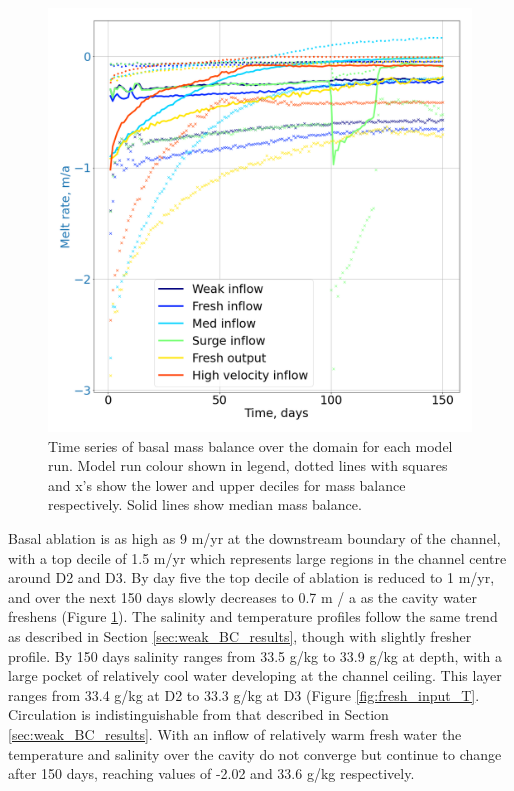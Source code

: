 \begin{figure}[!ht]
\centering
\includegraphics[width=1\textwidth]{chapters/4/compare_melt_sum.png}
\caption[Melt sum comparison]{Time series of basal mass balance over the domain for each model run. Model run colour shown in legend, dotted lines with squares and x's show the lower and upper deciles for mass balance respectively. Solid lines show median mass balance.}
\label{fig:compare_melt_sum}
\end{figure}


Basal ablation is as high as 9 m/yr at the downstream boundary of the channel, with a top decile of 1.5 m/yr which represents large regions in the channel centre around D2 and D3. By day five the top decile of ablation is reduced to 1 m/yr, and over the next 150 days  slowly decreases to 0.7 m / a as the cavity water freshens (Figure \ref{fig:compare_melt_sum}).
The salinity and temperature profiles follow the same trend as described in Section \ref{sec:weak_BC_results}, though with slightly fresher profile. By 150 days salinity ranges from 33.5 g/kg to 33.9 g/kg at depth, with a large pocket of relatively cool water developing at the channel ceiling. This layer ranges from 33.4 g/kg at D2  to 33.3 g/kg at D3 (Figure \ref{fig:fresh_input_T}. 
Circulation is indistinguishable from that described in Section \ref{sec:weak_BC_results}. 
With an inflow of relatively warm fresh  water the temperature and salinity over the cavity do not converge but continue to change after 150 days, reaching values of -2.02 \textdegree and 33.6 g/kg respectively.

